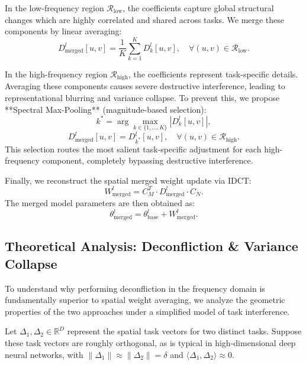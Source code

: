 \documentclass{article}
\theoremstyle{plain}
\theoremstyle{definition}
\theoremstyle{remark}
\begin{document}
In the low-frequency region $\mathcal{R}_{\text{low}}$, the coefficients capture global structural changes which are highly correlated and shared across tasks. We merge these components by linear averaging:
\begin{equation}
    D^l_{\text{merged}}[u, v] = \frac{1}{K} \sum_{k=1}^K D^l_k[u, v], \quad \forall (u, v) \in \mathcal{R}_{\text{low}}.
\end{equation}

In the high-frequency region $\mathcal{R}_{\text{high}}$, the coefficients represent task-specific details. Averaging these components causes severe destructive interference, leading to representational blurring and variance collapse. To prevent this, we propose **Spectral Max-Pooling** (magnitude-based selection):
\begin{equation}
    k^* = \arg\max_{k \in \{1, \dots, K\}} \left| D^l_k[u, v] \right|,
\end{equation}
\begin{equation}
    D^l_{\text{merged}}[u, v] = D^l_{k^*}[u, v], \quad \forall (u, v) \in \mathcal{R}_{\text{high}}.
\end{equation}
This selection routes the most salient task-specific adjustment for each high-frequency component, completely bypassing destructive interference.

Finally, we reconstruct the spatial merged weight update via IDCT:
\begin{equation}
    W^l_{\text{merged}} = C_M^T \cdot D^l_{\text{merged}} \cdot C_N.
\end{equation}
The merged model parameters are then obtained as:
\begin{equation}
    \theta^l_{\text{merged}} = \theta^l_{\text{base}} + W^l_{\text{merged}}.
\end{equation}

\subsection{Theoretical Analysis: Deconfliction \& Variance Collapse}
To understand why performing deconfliction in the frequency domain is fundamentally superior to spatial weight averaging, we analyze the geometric properties of the two approaches under a simplified model of task interference.

Let $\Delta_1, \Delta_2 \in \mathbb{R}^D$ represent the spatial task vectors for two distinct tasks. Suppose these task vectors are roughly orthogonal, as is typical in high-dimensional deep neural networks, with $\|\Delta_1\| \approx \|\Delta_2\| = \delta$ and $\langle \Delta_1, \Delta_2 \rangle \approx 0$. 
\end{document}
